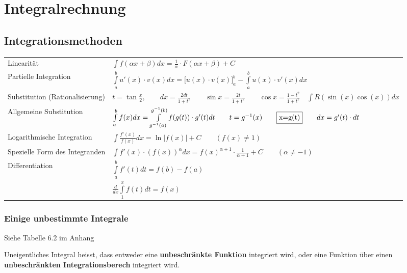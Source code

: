 \section{Integralrechnung }
\subsection{Integrationsmethoden }
  
  \begin{tabular}{ll}
    Linearit\"at & $\int{f(\alpha x+\beta )dx=\frac{1}{\alpha}\cdot F(\alpha x+\beta)+C}$ \\
    Partielle Integration & $\int\limits_a^b{u'(x)\cdot v(x)dx}=\biggl[
    u(x)\cdot v(x) \biggr]_a^b-\int\limits_a^b{u(x)\cdot v'(x)dx}$\\
    Substitution (Rationalisierung) & $t=\tan\frac{x}{2}, \qquad
    dx=\frac{2dt}{1+t^2} \qquad \sin  x=\frac{2t}{1+t^2} \qquad \cos x=\frac{1-t^2}{1+t^2}
    \quad\int{R(\sin(x)\cos(x))dx}$\\
    Allgemeine Substitution &
    $\int\limits_{a}^{b}{f(x)dx}=\int\limits_{g^{-1}(a)}^{g^{-1}(b)}{f(g(t))\cdot
    g'(t)dt}\qquad t=g^{-1}(x)\qquad  \fbox{x=g(t)}\qquad dx=g'(t)\cdot dt$\\
    Logarithmische Integration & $\int{\frac{f'(x)}{f(x)}dx}=\ln|f(x)|+C 
    \qquad{(f(x)\neq 1)}$\\
    Spezielle Form des Integranden & $\int{f'(x)\cdot (f(x))^{\alpha} dx}=
    f(x)^{\alpha +1}\cdot \frac{1}{\alpha+1}+C
    \qquad{(\alpha \neq -1)}$\\
    Differentiation & $\int \limits ^{b} _{a} {f'(t)dt}=f(b)-f(a)$\\
    & $\frac{d}{dx} \int \limits ^{x} _{1} {f(t)dt}=f(x)$
  \end{tabular}
  
  

\subsubsection{Einige unbestimmte Integrale }
Siehe Tabelle 6.2 im Anhang

  Uneigentliches Integral heisst, dass entweder eine \textbf{unbeschr\"ankte
  Funktion} integriert wird, oder eine Funktion \"uber einen
  \textbf{unbeschr\"ankten Integrationsberech} integriert wird.\\


